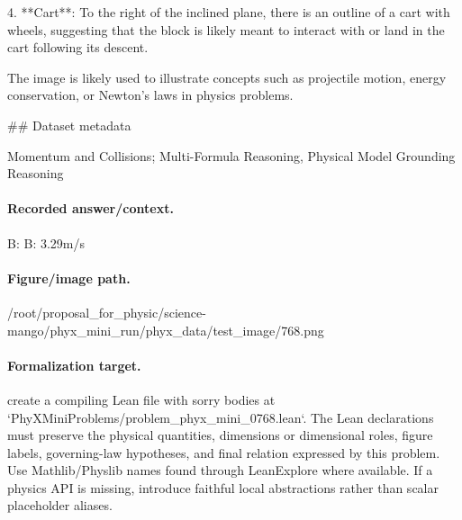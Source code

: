 4. **Cart**: To the right of the inclined plane, there is an outline of a cart with wheels, suggesting that the block is likely meant to interact with or land in the cart following its descent.

The image is likely used to illustrate concepts such as projectile motion, energy conservation, or Newton's laws in physics problems.

\#\# Dataset metadata

Momentum and Collisions; Multi-Formula Reasoning, Physical Model Grounding Reasoning

\paragraph{Recorded answer/context.}
B: B: 3.29m/s

\paragraph{Figure/image path.}
/root/proposal\_for\_physic/science-mango/phyx\_mini\_run/phyx\_data/test\_image/768.png

\paragraph{Formalization target.}
create a compiling Lean file with sorry bodies at `PhyXMiniProblems/problem\_phyx\_mini\_0768.lean`. The Lean declarations must preserve the physical quantities, dimensions or dimensional roles, figure labels, governing-law hypotheses, and final relation expressed by this problem.
Use Mathlib/Physlib names found through LeanExplore where available. If a physics API is missing, introduce faithful local abstractions rather than scalar placeholder aliases.

